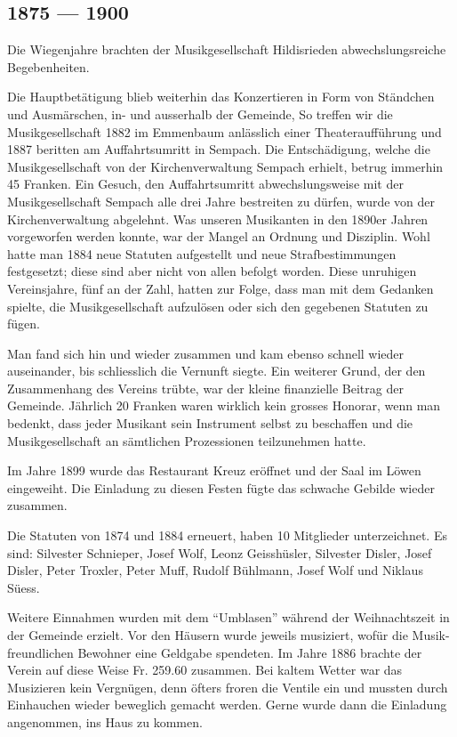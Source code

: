 \begin{multicols}{2}

    \subsection{1875 — 1900}

    Die Wiegenjahre brachten der Musikgesellschaft Hildisrieden abwechslungsreiche Begebenheiten.

    Die Hauptbetätigung blieb weiterhin das Konzertieren in Form von Ständchen und Ausmärschen,
    in- und ausserhalb der Gemeinde, So treffen wir die Musikgesellschaft
    1882 im Emmenbaum anlässlich einer Theateraufführung und 1887 beritten am Auffahrtsumritt in Sempach. Die Entschädigung,
    welche die Musikgesellschaft von der Kirchenverwaltung Sempach erhielt, betrug immerhin 45 Franken. Ein Gesuch, den
    Auffahrtsumritt abwechslungsweise mit der Musikgesellschaft Sempach alle drei Jahre bestreiten zu dürfen, wurde von der Kirchenverwaltung abgelehnt.
    Was unseren Musikanten in den 1890er Jahren vorgeworfen werden konnte,
    war der Mangel an Ordnung    und Disziplin. Wohl hatte man 1884 neue Statuten
    aufgestellt und neue Strafbestimmungen festgesetzt; diese sind aber nicht
    von allen befolgt worden. Diese unruhigen Vereinsjahre, fünf an der Zahl,
    hatten zur Folge, dass man mit dem Gedanken spielte, die Musikgesellschaft
    aufzulösen oder sich den gegebenen Statuten zu fügen.

    Man fand sich hin und wieder zusammen und kam
    ebenso schnell wieder auseinander, bis schliesslich die
    Vernunft siegte. Ein weiterer Grund, der den Zusammenhang des
    Vereins trübte, war der kleine finanzielle Beitrag der Gemeinde.
    Jährlich 20 Franken waren wirklich kein grosses Honorar, wenn man bedenkt,
    dass jeder Musikant sein Instrument selbst zu beschaffen und
    die Musikgesellschaft an sämtlichen Prozessionen teilzunehmen hatte.

    Im Jahre 1899 wurde das Restaurant Kreuz eröffnet und der Saal
    im Löwen eingeweiht. Die Einladung zu diesen Festen fügte das
    schwache Gebilde wieder zusammen.

    Die Statuten von 1874 und 1884 erneuert, haben 10
    Mitglieder unterzeichnet. Es sind: Silvester Schnieper,
    Josef Wolf, Leonz Geisshüsler, Silvester Disler, Josef
    Disler, Peter Troxler, Peter Muff, Rudolf Bühlmann,
    Josef Wolf und Niklaus Süess.

    Weitere Einnahmen wurden mit dem "`Umblasen"'  während der Weihnachtszeit
    in der Gemeinde erzielt. Vor den Häusern wurde jeweils musiziert, wofür die
    Musik-freundlichen Bewohner eine Geldgabe spendeten.
    Im Jahre 1886 brachte der Verein auf diese Weise Fr. 259.60 zusammen.
    Bei kaltem Wetter war das Musizieren kein Vergnügen, denn öfters froren
    die Ventile ein und mussten durch Einhauchen wieder beweglich gemacht werden.
    Gerne wurde dann die Einladung angenommen, ins Haus zu kommen.


\end{multicols}
